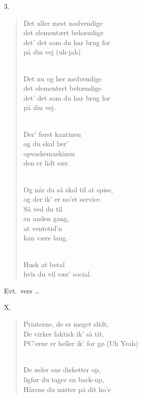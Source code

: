 \documentclass[a4paper,11pt]{article}
\begin{document}
3.
\begin{verse}
Det aller mest nødvendige\\
   det elementært behændige\\
   det' det som du har brug for\\
   på din vej (uh-jah)\\
\strut\\
   Det nu og her nødvendige\\
   det elementert behændige\\
   det' det som du har brug for\\
   på din vej.\\
\strut\\
   Der' først kantinen\\
   og du skal lær'\\
   opvaskemaskinen\\
   den er lidt sær.\\
\strut\\
   Og når du så skal til at spise,\\
   og der ik' er no'et service.\\
   Så ved du til \\
   en anden gang,\\
   at ventetid'n\\
   kan være lang.\\
\strut\\
   Husk at betal\\
   hvis du vil vær' social.\\
\end{verse}


Evt.\ vers \dots

X.
\begin{verse}
Printerne, de er meget slidt,\\
   De virker faktisk ik' så tit,\\
   PC'erne er heller ik' for gø (Uh Yeah)\\
\strut\\
   De æder ens disketter op,\\
   ligfør du tager en back-up,\\
   Hårene du mister på dit ho'e\\
\end{verse}
\end{document}
